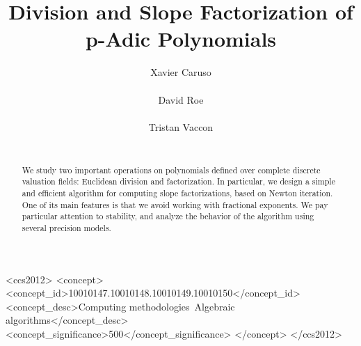 \documentclass{sig-alternate-05-2015}
\begin{document}
\newtheorem{theo}{Theorem}[section]
\newtheorem{lem}[theo]{Lemma}
\newtheorem{prop}[theo]{Proposition}
\newtheorem{cor}[theo]{Corollary}
\newtheorem{quest}[theo]{Question}
\newtheorem{conj}[theo]{Conjecture}
\theoremstyle{definition}
\newtheorem{rem}[theo]{Remark}
\newtheorem{ex}[theo]{Example}
\newtheorem{deftn}[theo]{Definition}

\title{Division and Slope Factorization of p-Adic Polynomials}

\author{
\alignauthor Xavier Caruso\\
  \\
\alignauthor David Roe \\
  \\
\alignauthor Tristan Vaccon\\
  \\
}

\maketitle

\begin{abstract}
We study two important operations on polynomials defined over complete 
discrete valuation fields: Euclidean division and factorization. In particular,
we design a simple and efficient algorithm for computing slope factorizations,
based on Newton iteration.  One of its main features is that we avoid working
with fractional exponents.
We pay particular attention to stability, and analyze the behavior
of the algorithm using several precision models.
\end{abstract}

\begin{CCSXML}
<ccs2012>
<concept>
<concept_id>10010147.10010148.10010149.10010150</concept_id>
<concept_desc>Computing methodologies~Algebraic algorithms</concept_desc>
<concept_significance>500</concept_significance>
</concept>
</ccs2012>
\end{CCSXML}

\vspace{-1mm}
\printccsdesc

\vspace{-1.5mm}
\end{document}

